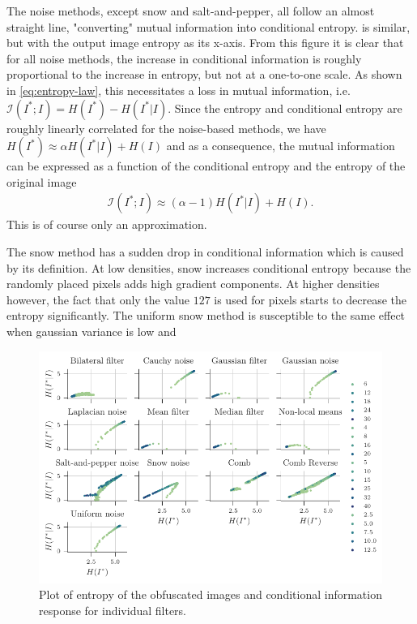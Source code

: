 The noise methods, except snow and salt-and-pepper, all follow an almost straight line, "converting" mutual information into conditional entropy.  is similar, but with the output image entropy as its x-axis. From this figure it is clear that for all noise methods, the increase in conditional information is roughly proportional to the increase in entropy, but not at a one-to-one scale. As shown in \cref{eq:entropy-law}, this necessitates a loss in mutual information, i.e. $\mathcal{I}(I^*;I) = H(I^*) - H(I^*|I)$. Since the entropy and conditional entropy are roughly linearly correlated for the noise-based methods, we have $H(I^*) \approx \alpha H(I^*|I) + H(I)$ and as a consequence, the mutual information can be expressed as a function of the conditional entropy and the entropy of the original image 
\begin{align*}
\mathcal{I}(I^*;I) \approx (\alpha-1)H(I^*|I) + H(I).
\end{align*}
This is of course only an approximation.

The snow method has a sudden drop in conditional information which is caused by its definition. At low densities, snow increases conditional entropy because the randomly placed pixels adds high gradient components. At higher densities however, the fact that only the value $127$ is used for pixels starts to decrease the entropy significantly. The uniform snow method is susceptible to the same effect when gaussian variance is low and 

\begin{figure}
	\centering
	
	\includegraphics[width=1\textwidth]{figures/results/individual-ent}
	
	\caption{Plot of entropy of the obfuscated images and conditional information response for individual filters.}\label{fig:individual-entropy}
\end{figure}

